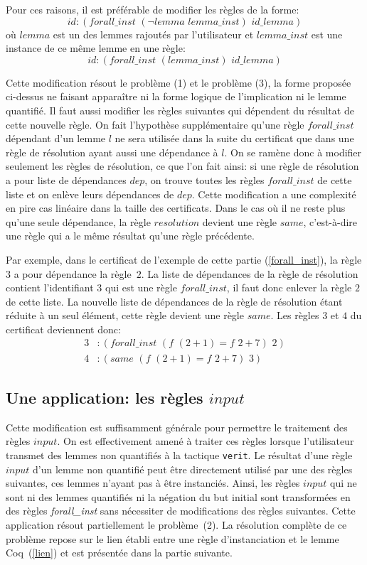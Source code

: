 \documentclass[11pt]{article}
\begin{document}
Pour ces raisons, il est préférable de modifier les règles de la forme:
\[id:(forall\_inst \,\,(\neg lemma \,\, lemma\_inst) \,\,id\_lemma)\]
où $lemma$ est un des lemmes rajoutés par l'utilisateur et $lemma\_inst$ est une instance de ce même lemme en une règle:
\[id:(forall\_inst \,\,(lemma\_inst) \,\, id\_lemma)\]

Cette modification résout le problème (1) et le problème (3), la forme proposée ci-dessus ne faisant apparaître ni la forme logique de l'implication ni le lemme quantifié. Il faut aussi modifier les règles suivantes qui dépendent du résultat de cette nouvelle règle. On fait l'hypothèse supplémentaire qu'une règle $forall\_inst$ dépendant d'un lemme $l$ ne sera utilisée dans la suite du certificat que dans une règle de résolution ayant aussi une dépendance à $l$. On se ramène donc à modifier seulement les règles de résolution, ce que l'on fait ainsi: si une règle de résolution a pour liste de dépendances $dep$, on trouve toutes les règles $forall\_inst$ de cette liste et on enlève leurs dépendances de $dep$. Cette modification a une complexité en pire cas linéaire dans la taille des certificats. Dans le cas où il ne reste plus qu'une seule dépendance, la règle $resolution$ devient une règle $same$, c'est-à-dire une règle qui a le même résultat qu'une règle précédente. \medbreak

Par exemple, dans le certificat de l'exemple de cette partie (\ref{forall_inst}), la règle $3$ a pour dépendance la règle~$2$. La liste de dépendances de la règle de résolution contient l'identifiant $3$ qui est une règle $forall\_inst$, il faut donc enlever la règle $2$ de cette liste. La nouvelle liste de dépendances de la règle de résolution étant réduite à un seul élément, cette règle devient une règle $same$. Les règles $3$ et $4$ du certificat deviennent donc:
\begin{align*}
3&:(forall\_inst \,\, (f\,\, (2+1) = f\,\,2+7) \,\,2) \\
4&:(same  \,\, (f \,\,(2+1) = f\,\,2+7) \,\,3) 
\end{align*}

\subsection{Une application: les règles $input$}

Cette modification est suffisamment générale pour permettre le traitement des règles $input$. On est effectivement amené à traiter ces règles lorsque l'utilisateur transmet des lemmes non quantifiés à la tactique \texttt{verit}. Le résultat d'une règle $input$ d'un lemme non quantifié peut être directement utilisé par une des règles suivantes, ces lemmes n'ayant pas à être instanciés. Ainsi, les règles $input$ qui ne sont ni des lemmes quantifiés ni la négation du but initial sont transformées en des règles \textit{forall\_inst} sans nécessiter de modifications des règles suivantes. Cette application résout partiellement le problème~(2). La résolution complète de ce problème repose sur le lien établi entre une règle d'instanciation et le lemme Coq~(\ref{lien}) et est présentée dans la partie suivante.
\end{document}
